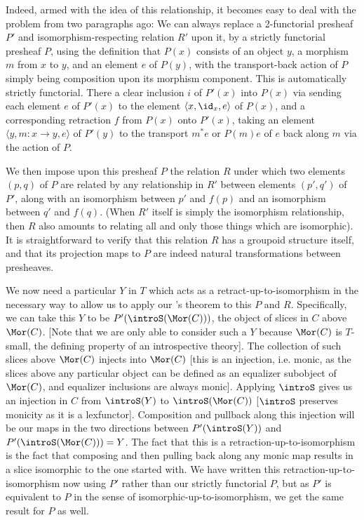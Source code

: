 Indeed, armed with the idea of this relationship, it becomes easy to deal with the problem from two paragraphs ago: We can always replace a 2-functorial presheaf $P'$ and isomorphism-respecting relation $R'$ upon it, by a strictly functorial presheaf $P$, using the definition that $P(x)$ consists of an object $y$, a morphism $m$ from $x$ to $y$, and an element $e$ of $P(y)$, with the transport-back action of $P$ simply being composition upon its morphism component. This is automatically strictly functorial. There a clear inclusion $i$ of $P'(x)$ into $P(x)$ via sending each element $e$ of $P'(x)$ to the element $\langle x, \id_x, e \rangle$ of $P(x)$, and a corresponding retraction $f$ from $P(x)$ onto $P'(x)$, taking an element $\langle y, m : x \to y, e \rangle$ of $P'(y)$ to the transport $m^* e$ or $P(m) e$ of $e$ back along $m$ via the action of $P$.

We then impose upon this presheaf $P$ the relation $R$ under which two elements $(p, q)$ of $P$ are related by any relationship in $R'$ between elements $(p', q')$ of $P'$, along with an isomorphism between $p'$ and $f(p)$ and an isomorphism between $q'$ and $f(q)$. (When $R'$ itself is simply the isomorphism relationship, then $R$ also amounts to relating all and only those things which are isomorphic). It is straightforward to verify that this relation $R$ has a groupoid structure itself, and that its projection maps to $P$ are indeed natural transformations between presheaves. 

We now need a particular $Y$ in $T$ which acts as a retract-up-to-isomorphism in the necessary way to allow us to apply our \Loeb's theorem to this $P$ and $R$. Specifically, we can take this $Y$ to be $P'(\introS(\Mor(C)))$, the object of slices in $C$ above $\Mor(C)$. [Note that we are only able to consider such a $Y$ because $\Mor(C)$ is $T$-small, the defining property of an introspective theory]. The collection of such slices above $\Mor(C)$ injects into $\Mor(C)$ [this is an injection, i.e. monic, as the slices above any particular object can be defined as an equalizer subobject of $\Mor(C)$, and equalizer inclusions are always monic]. Applying $\introS$ gives us an injection in $C$ from $\introS(Y)$ to $\introS(\Mor(C))$ [$\introS$ preserves monicity as it is a lexfunctor]. Composition and pullback along this injection will be our maps in the two directions between $P'(\introS(Y))$ and $P'(\introS(\Mor(C))) = Y$. The fact that this is a retraction-up-to-isomorphism is the fact that composing and then pulling back along any monic map results in a slice isomorphic to the one started with. We have written this retraction-up-to-isomorphism now using $P'$ rather than our strictly functorial $P$, but as $P'$ is equivalent to $P$ in the sense of isomorphic-up-to-isomorphism, we get the same result for $P$ as well. 

